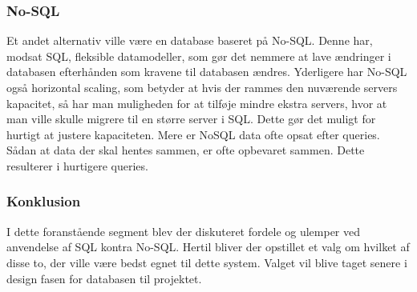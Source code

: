 \subsubsection{No-SQL}
Et andet alternativ ville være en database baseret på No-SQL. Denne har, modsat SQL, fleksible datamodeller, som gør det nemmere at lave ændringer i databasen efterhånden som kravene til databasen ændres. Yderligere har No-SQL også horizontal scaling, som betyder at hvis der rammes den nuværende servers kapacitet, så har man muligheden for at tilføje mindre ekstra servers, hvor at man ville skulle migrere til en større server i SQL. Dette gør det muligt for hurtigt at justere kapaciteten. 
Mere er NoSQL data ofte opsat efter queries. Sådan at data der skal hentes sammen, er ofte opbevaret sammen. Dette resulterer i hurtigere queries.

\subsubsection{Konklusion}
I dette foranstående segment blev der diskuteret fordele og ulemper ved anvendelse af SQL kontra No-SQL. Hertil bliver der opstillet et valg om hvilket af disse to, der ville være bedst egnet til dette system. Valget vil blive taget senere i design fasen for databasen til projektet.

